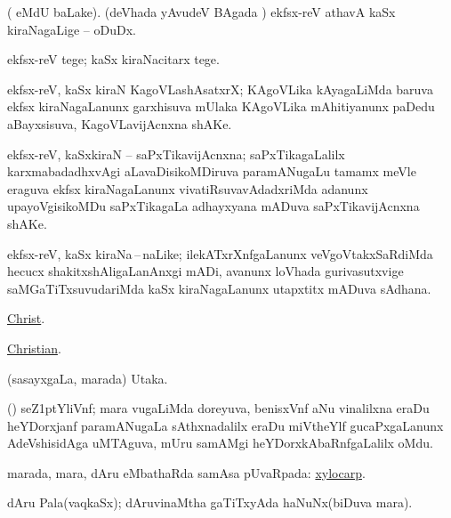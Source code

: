 \bentry
{}
\gl{\sakirx} 
\bmng
( eMdU baLake). (deVhada yAvudeV BAgada \vi)
\banum
{} ekfsx-reV athavA kaSx kiraNagaLige -- oDuDx. 

 ekfsx-reV tege; kaSx kiraNacitarx tege.
\eanum
\emng
\eentry

\bentry
{}
\gl{\nA}
\bmng
ekfsx-reV, kaSx kiraN  KagoVLashAsatxrX; KAgoVLika kAyagaLiMda  baruva ekfsx kiraNagaLanunx  garxhisuva mUlaka KAgoVLika mAhitiyanunx  paDedu aBayxsisuva, KagoVLavijAcnxna shAKe. 
\emng 
\eentry

\bentry
{}
\gl{\nA}
\bmng
ekfsx-reV, kaSxkiraN -- saPxTikavijAcnxna; saPxTikagaLalilx karxmabadadhxvAgi aLavaDisikoMDiruva paramANugaLu  tamamx meVle eraguva ekfsx kiraNagaLanunx vivatiRsuvavAdadxriMda adanunx  upayoVgisikoMDu saPxTikagaLa adhayxyana mADuva saPxTikavijAcnxna shAKe.
\emng
\eentry

\bentry
{}
\gl{\nA} 
\bmng
ekfsx-reV, kaSx kiraNa\,--\,naLike; ilekATxrXnfgaLanunx  veVgoVtakxSaRdiMda hecucx shakitxshAligaLanAnxgi mADi, avanunx  loVhada gurivasutxvige saMGaTiTxsuvudariMda  kaSx kiraNagaLanunx  utapxtitx mADuva sAdhana.
\emng 
\eentry

\bentry
{}
\gl{\saMkiSx} 
\bmng
\hyperref{kandict_c.pdf}{C}{Christ}{Christ}.
\emng
\eentry

\bentry
{}
\gl{\saMkiSx}
\bmng
\hyperref{kandict_c.pdf}{C}{Christian}{Christian}.
\emng
\eentry

\bentry
{} 
\gl{\nA} 
\bmng
(sasayxgaLa, marada) Utaka.
\emng 
\eentry

\bentry
{} 
\gl{\nA}
\bmng
(\ravi) seZ\kern1ptYliVnf; mara \mo vugaLiMda doreyuva, benisxVnf aNu vinalilxna eraDu heYDorxjanf paramANugaLa sAthxnadalilx eraDu miVtheYlf  gucaPxgaLanunx AdeVshisidAga uMTAguva, mUru samAMgi heYDorxkAbaRnfgaLalilx oMdu.
\emng 
\eentry

\bentry
{} 
\gl{\sapUpa}
\bmng
marada, mara, dAru eMbathaRda samAsa pUvaRpada: \hyperlink{xylocarp}{xylocarp}.
\emng 
\eentry

\bentry
{} 
\gl{\nA} 
\bmng
dAru Pala(vaqkaSx); dAruvinaMtha gaTiTxyAda haNuNx(biDuva mara).
\emng
\eentry

